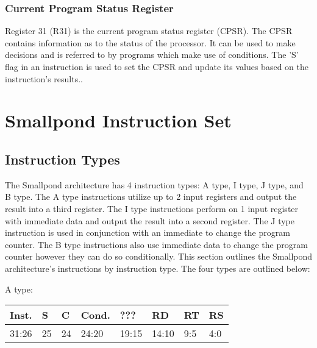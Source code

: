 \documentclass[12pt]{article}
\begin{document}
    \subsubsection{Current Program Status Register}
        Register 31 (R31) is the current program status register (CPSR). The CPSR contains information as to the status of the processor. It can be used to make decisions and is referred to by programs which make use of conditions. The 'S' flag in an instruction is used to set the CPSR and update its values based on the instruction's results..
    

\newpage
\section{Smallpond Instruction Set}

\subsection{Instruction Types}
    The Smallpond architecture has 4 instruction types: A type, I type, J type, and B type. The A type instructions utilize up to 2 input registers and output the result into a third register. The I type instructions perform on 1 input register with immediate data and output the result into a second register. The J type instruction is used in conjunction with an immediate to change the program counter. The B type instructions also use immediate data to change the program counter however they can do so conditionally. This section outlines the Smallpond architecture's instructions by instruction type. The four types are outlined below:\\

    \begin{center}
        A type:\\
        \vspace{1em}
        \begin{tabular}{ |p{1.8cm}|p{.3cm}|p{.3cm}|p{1.5cm}|p{1.5cm}|p{1.5cm}|p{1.5cm}|p{1.5cm}| }
            \hline
            \textbf{Inst.} & \textbf{S}& \textbf{C} & \textbf{Cond.} & ??? & \textbf{RD} & \textbf{RT} & \textbf{RS}\\
            \hline
            31:26& 25 & 24 & 24:20 & 19:15 & 14:10 & 9:5 & 4:0\\
            \hline
        \end{tabular}
    \end{center}
    
\end{document}
